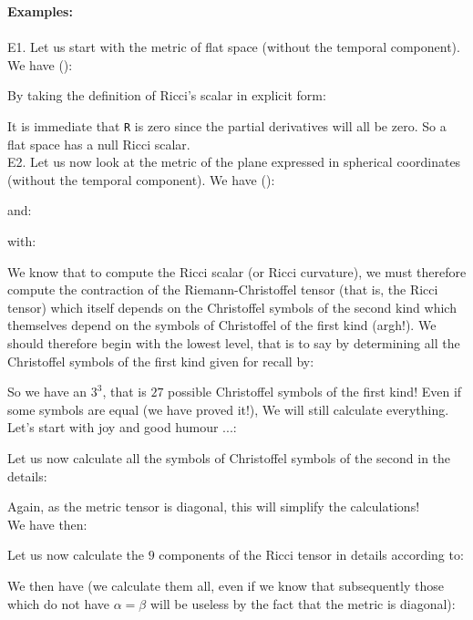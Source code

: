 	\begin{tcolorbox}[colframe=black,colback=white,sharp corners]
	\textbf{{\Large {}}Examples:}\\\\
	E1. Let us start with the metric of flat space (without the temporal component). We have ():
	
	By taking the definition of Ricci's scalar in explicit form:
	
	It is immediate that \texttt{R} is zero since the partial derivatives will all be zero. So a flat space has a null Ricci scalar.\\
	
	E2. Let us now look at the metric of the plane expressed in spherical coordinates (without the temporal component). We have ():
	
	and:
	
	with:
	
	We know that to compute the Ricci scalar (or Ricci curvature), we must therefore compute the contraction of the Riemann-Christoffel tensor (that is, the Ricci tensor) which itself depends on the Christoffel symbols of the second kind which themselves depend on the symbols of Christoffel of the first kind (argh!). We should therefore begin with the lowest level, that is to say by determining all the Christoffel symbols of the first kind given for recall by:
	
	
	\end{tcolorbox}
	\begin{tcolorbox}[colframe=black,colback=white,sharp corners]
	So we have an $3^3$, that is $27$ possible Christoffel symbols of the first kind! Even if some symbols are equal (we have proved it!), We will still calculate everything.\\

	Let's start with joy and good humour ...:
	
	\end{tcolorbox}
	
	\begin{tcolorbox}[colframe=black,colback=white,sharp corners]
	
	Let us now calculate all the symbols of Christoffel symbols of the second in the details:
	
	Again, as the metric tensor is diagonal, this will simplify the calculations!\\

	We have then:
	
	\end{tcolorbox}
	\begin{tcolorbox}[colframe=black,colback=white,sharp corners]
	Let us now calculate the $9$ components of the Ricci tensor in details according to:
	
	We then have (we calculate them all, even if we know that subsequently those which do not have $\alpha=\beta$ will be useless by the fact that the metric is diagonal):
	
	\end{tcolorbox}
	
